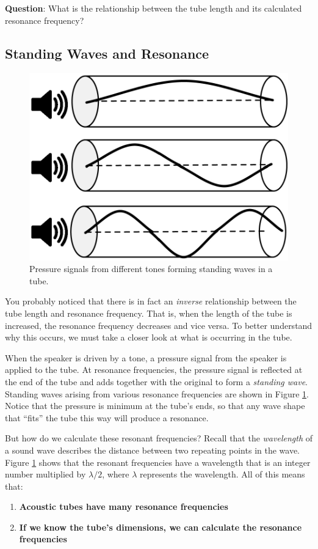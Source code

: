 \documentclass[12pt]{article}
\begin{document}
\textbf{Question}: What is the relationship between the tube length and its calculated resonance frequency?

\newpage

\subsection{Standing Waves and Resonance}
\begin{figure}
	\vspace{-20pt}
	\begin{center}
	\includegraphics[width= .35 \textwidth]{images/resonance/harmonics2.pdf}
	\vspace{-10pt}
	\caption{\label{tubeResonances}Pressure signals from different tones forming standing waves in a tube.}
	\end{center}
	\vspace{-10pt}
\end{figure}

You probably noticed that there is in fact an \emph{inverse} relationship between the tube length and resonance frequency. That is, when the length of the tube is increased, the resonance frequency decreases and vice versa. To better understand why this occurs, we must take a closer look at what is occurring in the tube.

When the speaker is driven by a tone, a pressure signal from the speaker is applied to the tube. At resonance frequencies, the pressure signal is reflected at the end of the tube and adds together with the original to form a \emph{standing wave}. Standing waves arising from various resonance frequencies are shown in Figure \ref{tubeResonances}. Notice that the pressure is minimum at the tube's ends, so that any wave shape that ``fits'' the tube this way will produce a resonance.

But how do we calculate these resonant frequencies? Recall that the \emph{wavelength} of a sound wave describes the distance between two repeating points in the wave. Figure \ref{tubeResonances} shows that the resonant frequencies have a wavelength that is an integer number multiplied by $\lambda/2$, where $\lambda$ represents the wavelength. All of this means that:
\begin{enumerate}
\item \textbf{Acoustic tubes have many resonance frequencies}
\item \textbf{If we know the tube's dimensions, we can calculate the resonance frequencies}
\end{enumerate}
\end{document}

